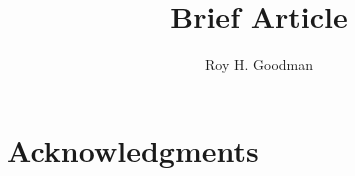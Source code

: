 \documentclass[11pt]{amsart}
\title{Brief Article}
\author{Roy H. Goodman}
\date{}                                           %
\numberwithin{equation}{section}
\begin{document}
\maketitle


\section*{Acknowledgments}

%
\end{document}
